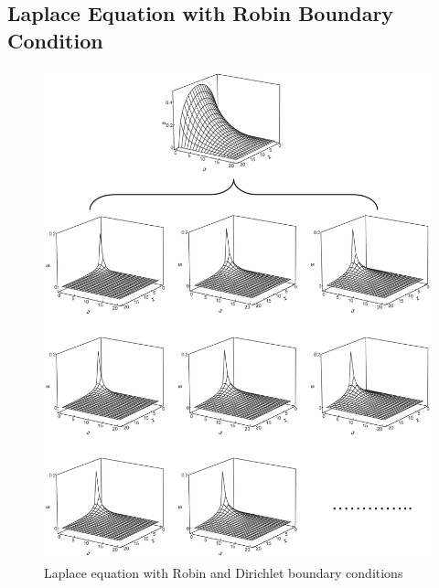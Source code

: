 \subsection{Laplace Equation with Robin Boundary Condition}%

\begin{figure}[htbp]
\includegraphics[width=6in]{../figures/SES/example_Laplace+Robin+Dirichlet.pdf}%
\caption{Laplace equation with Robin and Dirichlet boundary conditions}
\label{fig:example-Laplace-Robin-Dirichlet}
\end{figure}

